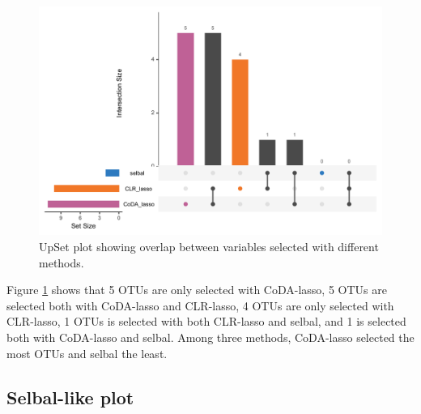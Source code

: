 \documentclass[openany]{book}
\newenvironment{Shaded}{\begin{snugshade}}{\end{snugshade}}
\newcommand{\KeywordTok}[1]{\textcolor[rgb]{0.13,0.29,0.53}{\textbf{#1}}}
\newcommand{\DataTypeTok}[1]{\textcolor[rgb]{0.13,0.29,0.53}{#1}}
\newcommand{\StringTok}[1]{\textcolor[rgb]{0.31,0.60,0.02}{#1}}
\newcommand{\CommentTok}[1]{\textcolor[rgb]{0.56,0.35,0.01}{\textit{#1}}}
\newcommand{\OperatorTok}[1]{\textcolor[rgb]{0.81,0.36,0.00}{\textbf{#1}}}
\newcommand{\NormalTok}[1]{#1}
\begin{document}
\begin{figure}

{\centering \includegraphics[width=1\linewidth]{./Generated_plots/upsetHFHS-1} 

}

\caption{UpSet plot showing overlap between variables selected with different methods.}\label{fig:upsetHFHS}
\end{figure}

Figure \ref{fig:upsetHFHS} shows that 5 OTUs are only selected with
CoDA-lasso, 5 OTUs are selected both with CoDA-lasso and CLR-lasso, 4
OTUs are only selected with CLR-lasso, 1 OTUs is selected with both
CLR-lasso and selbal, and 1 is selected both with CoDA-lasso and selbal.
Among three methods, CoDA-lasso selected the most OTUs and selbal the
least.

\subsection{Selbal-like plot}\label{selbal-like-plot-1}

\begin{Shaded}
\end{Shaded}
\end{document}

